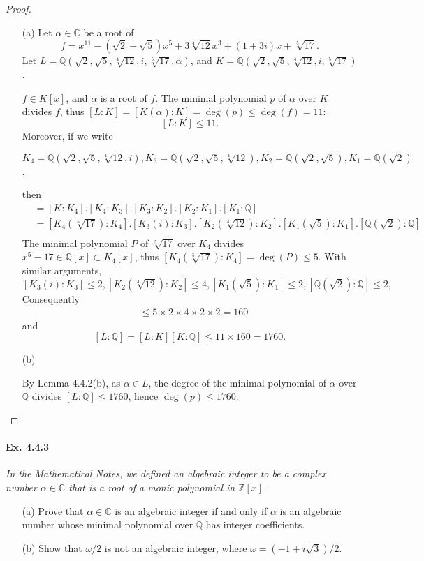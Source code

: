 \documentclass[11pt,a4paper]{article}
\newcommand{\Q}{\mathbb{Q}}
\newcommand{\Z}{\mathbb{Z}}
\newcommand{\C}{\mathbb{C}}
\begin{document}
\begin{proof}
\begin{enumerate}
\item[(a)]
Let $\alpha \in \C$ be a root of 
$$f = x^{11}-(\sqrt{2}+\sqrt{5}) x^5+3\sqrt[4]{12}x^3+(1+3i) x +\sqrt[5]{17}.$$
Let $L = \Q(\sqrt{2},\sqrt{5},\sqrt[4]{12},i,\sqrt[5]{17},\alpha)$, and $K = \Q(\sqrt{2},\sqrt{5},\sqrt[4]{12},i,\sqrt[5]{17})$.

$f \in K[x]$, and $\alpha$ is a root of $f$. The minimal polynomial $p$ of $\alpha$ over $K$ divides $f$, thus  $[L : K] = [K(\alpha) : K] =\deg(p) \leq \deg(f)=11$:
$$[L : K]\leq 11.$$
Moreover, if we write 

$K_4  =  \Q(\sqrt{2},\sqrt{5},\sqrt[4]{12},i), K_3 =  \Q(\sqrt{2},\sqrt{5},\sqrt[4]{12}),K_2 =  \Q(\sqrt{2},\sqrt{5}), K_1 = \Q(\sqrt{2})$,

then
\begin{align*}
[K : \Q] &= [K : K_4] .[K_4:K_3] .[K_3:K_2] .[K_2:K_1] .[K_1:\Q]\\
&  = [K_4( \sqrt[5]{17}): K_4]. [K_3(i):K_3]. [K_2(\sqrt[4]{12}):K_2] .[K_1(\sqrt{5}):K_1]. [\Q(\sqrt{2}):\Q]\\
\end{align*}
 The minimal polynomial $P$ of $ \sqrt[5]{17}$ over $K_4$ divides $x^5-17 \in \Q[x] \subset K_4[x]$, thus $[K_4(\sqrt[5]{17}) : K_4] = \deg(P) \leq 5$. With similar arguments, 
 $$[K_3(i):K_3] \leq 2, [K_2(\sqrt[4]{12}):K_2] \leq 4, [K_1(\sqrt{5}):K_1] \leq 2,[\Q(\sqrt{2}):\Q] \leq 2,$$
Consequently
\begin{align*}
[K : \Q] &\leq 5\times 2 \times 4 \times 2 \times 2 = 160
\end{align*}
and
 $$[L : \Q] = [L:K][K:\Q] \leq 11 \times 160 = 1760.$$

\item[(b)]

By Lemma 4.4.2(b),  as $\alpha \in L$, the degree of the minimal polynomial of  $\alpha$ over $\Q$ divides ${[L:\Q] \leq 1760}$, hence $\deg(p) \leq 1760$.
\end{enumerate}
\end{proof}

\paragraph{Ex. 4.4.3}

{\it In the Mathematical Notes, we defined an algebraic integer to be a complex number $\alpha \in \C$ that is a root of a monic polynomial in $\Z[x]$.
\begin{enumerate}
\item[(a)] Prove that $\alpha \in \C$ is an algebraic integer if and only if $\alpha$ is an algebraic number whose minimal polynomial over $\Q$ has integer coefficients.
\item[(b)] Show that $\omega/2$ is not an algebraic integer, where $\omega = (-1+i\sqrt{3})/2$.
\end{enumerate}
}
\end{document}
